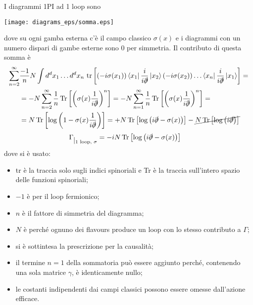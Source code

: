 \documentclass[a4paper,11pt]{amsart}
\newcommand{\ket}[1]{\left | #1 \right \rangle}
\newcommand{\bra}[1]{\left \langle  #1 \right |}
\newcommand{\nl}{\vskip 0.3cm}
\DeclareMathOperator{\Tr}{Tr}
\DeclareMathOperator{\tr}{tr}
\begin{document}
I diagrammi 1PI ad 1 loop sono
\begin{center}
\texttt{[image: diagrams\_eps/somma.eps]}
\end{center}
dove su ogni gamba esterna c'è il campo classico $\sigma(x)$ e i diagrammi con un numero dispari di gambe esterne sono 0 per simmetria. Il contributo di questa somma è
\begin{align*}
 \sum_{n=2}^{\infty} &\frac{-1}{n}N\int d^d x_1 \dots d^d x_n\, \tr\left[ (-i  \sigma (x_1))\bra{x_1}\frac{i}{i\slashed{\partial}}\ket{x_2}(-i \sigma (x_2)) \dots \bra{x_n}\frac{i}{i\slashed{\partial}}\ket{x_1}\right]  = \\
 & = -N \sum_{n=2}^{\infty} \frac{1}{n} \Tr\left[\left( \sigma(x)\frac{1}{i\slashed{\partial}}\right)^n\right] = -N \sum_{n=1}^{\infty} \frac{1}{n} \Tr\left[\left( \sigma(x)\frac{1}{i\slashed{\partial}}\right)^n\right] = \\
 &= N \Tr\left[ \log \left( 1 -  \sigma(x)\frac{1}{i\slashed{\partial}} \right) \right] = + N\Tr \left[\log\left(i\slashed{\partial} -  \sigma(x)\right)\right] -\cancel{N\Tr \left[\log\left(i\slashed{\partial}\right)\right]}
 \end{align*}
 \begin{align}
 & \Gamma\raisebox{-0.15cm}{$|_{\text{1 loop, }\sigma}$} = -iN\Tr \left[\log\left(i\slashed{\partial} -  \sigma(x)\right)\right] \label{eq:gamma1loop}
 \end{align}  
dove si è usato:
\begin{itemize}
 \item tr è la traccia solo sugli indici spinoriali e Tr è la traccia sull'intero spazio delle funzioni spinoriali;
 \item $-1$ è per il loop fermionico;
 \item $n$ è il fattore di simmetria del diagramma;
 \item $N$ è perché ognuno dei flavours produce un loop con lo stesso contributo a $\Gamma$;
 \item si è sottintesa la prescrizione per la causalità;
 \item il termine $n=1$ della sommatoria può essere aggiunto perché, contenendo una sola matrice $\gamma$, è identicamente nullo;
 \item le costanti indipendenti dai campi classici possono essere omesse dall'azione efficace.
\end{itemize}
\nl
\end{document}
